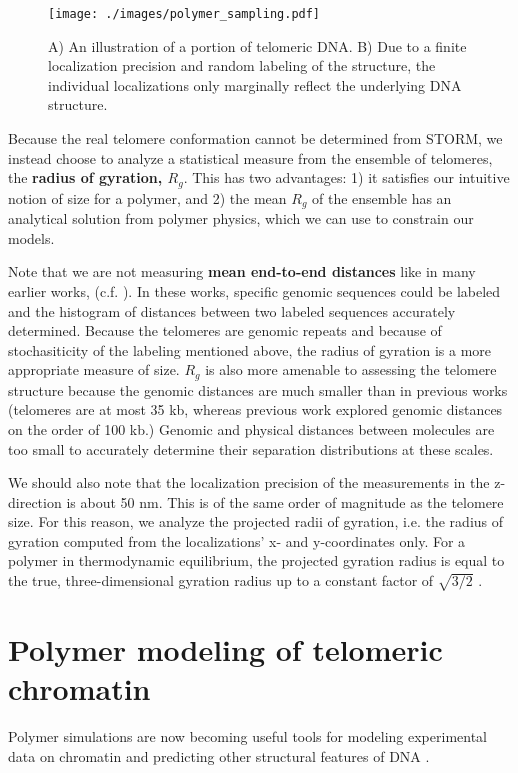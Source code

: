 \documentclass[11pt]{article}
\begin{document}
\begin{figure}[htb]
\centering
\texttt{[image: ./images/polymer\_sampling.pdf]}
\caption{\label{fig-sampling}A) An illustration of a portion of telomeric DNA. B) Due to a finite localization precision and random labeling of the structure, the individual localizations only marginally reflect the underlying DNA structure.}
\end{figure}

Because the real telomere conformation cannot be determined from
STORM, we instead choose to analyze a statistical measure from the
ensemble of telomeres, the \textbf{radius of gyration, $R_g$}. This has two
advantages: 1) it satisfies our intuitive notion of size for a
polymer, and 2) the mean $R_g$ of the ensemble has an analytical
solution from polymer physics, which we can use to constrain our
models.

Note that we are not measuring \textbf{mean end-to-end distances} like in
many earlier works, (c.f. \cite{bystricky-pnas-2004}). In these works,
specific genomic sequences could be labeled and the histogram of
distances between two labeled sequences accurately determined. Because
the telomeres are genomic repeats and because of stochasiticity of the
labeling mentioned above, the radius of gyration is a more appropriate
measure of size. $R_g$ is also more amenable to assessing the telomere
structure because the genomic distances are much smaller than in
previous works (telomeres are at most 35 kb, whereas previous work
explored genomic distances on the order of 100 kb.) Genomic and
physical distances between molecules are too small to accurately
determine their separation distributions at these scales.

We should also note that the localization precision of the
measurements in the z-direction is about 50 nm. This is of the same
order of magnitude as the telomere size. For this reason, we analyze
the projected radii of gyration, i.e. the radius of gyration computed
from the localizations' x- and y-coordinates only. For a polymer in
thermodynamic equilibrium, the projected gyration radius is equal to
the true, three-dimensional gyration radius up to a constant factor of
$\sqrt{3/2}$ \cite{rivetti-jmolbiol-1996}.

\section{Polymer modeling of telomeric chromatin}
\label{sec-3}
Polymer simulations are now becoming useful tools for modeling
experimental data on chromatin and predicting other structural
features of DNA \cite{rivetti-jmolbiol-1996, giorgetti-cell-2014}.
\end{document}
